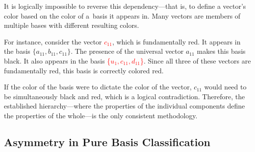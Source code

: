 \documentclass[%
  reprint,
  superscriptaddress,
  showpacs,
  showkeys,
  amsmath,amssymb,
  pra,
  longbibliography,
  floatfix,
  x11names
]{revtex4-2}
\begin{document}
It is logically impossible to reverse this dependency---that is, to define a vector's color based on the color of a~basis it appears in. Many vectors are members of multiple bases with different resulting colors.

For instance, consider the vector \textcolor{red}{$c_{11}$}, which is fundamentally red.
It appears in the basis $\{a_{11}, b_{11}, c_{11}\}$. The presence of the universal vector $a_{11}$  makes this basis {black}.
It also appears in the basis \textcolor{red}{\{${u_1}, {c_{11}}, {d_{11}}$\}}. Since all three of these vectors are fundamentally red,
this basis is correctly colored {red}.

If the color of the basis were to dictate the color of the vector,  {$c_{11}$} would need to be simultaneously black and red,
which is a logical contradiction.
Therefore, the established hierarchy---where the properties of the individual components define the properties of the whole---is the only consistent methodology.




%

\subsection{Asymmetry in Pure Basis Classification}
\label{ch:asymm}
\end{document}
